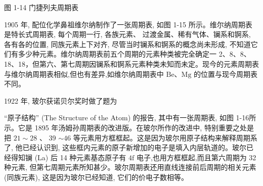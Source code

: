 \documentclass[10pt]{article}
\begin{document}
图 1-14 门捷列夫周期表

1905 年, 配位化学鼻祖维尔纳制作了一张周期表, 如图 1-15 所示。维尔纳周期表是特长式周期表, 每个周期一行, 各族元素、 过渡金属、稀有气体、镧系和锕系, 各有各的位置, 同族元素上下对齐, 尽管当时镧系和锕系的概念尚未形成, 不知道它们有多少种元素。维尔纳周期表前五个周期的元素种类被完全确定一 2、8、8、18、18，但第六、第七周期因镧系和锕系元素种类未知而未定。现今的元素周期表与维尔纳周期表相似,但也有差异,如维尔纳周期表中 \(\mathrm{{Be}}\text{、}\mathrm{{Mg}}\) 的位置与现今周期表不同。

1922 年, 玻尔获诺贝尔奖时做了题为

“原子结构” (The Structure of the Atom) 的报告, 其中有一张周期表, 如图 1-16所示。它是 1895 年汤姆孙周期表的改进版。在玻尔所作的改进中, 特别重要之处是把 \({21} \sim {28}\) 、 39 \(\sim {46}\) 等元素用方框框起。这是因为玻尔用原子结构来解释周期系了, 他已经认识到, 这些框内元素的原子新增加的电子是填入内层轨道的。玻尔已经得知镧 (La) 后 14 种元素基态原子有 \(4\mathrm{f}\) 电子,也用方框框起,而且第六周期为 32 种元素, 但第七周期元素所知甚少。玻尔周期表还用直线连接前后周期的相关元素 (同族元素), 这是因为玻尔已经知道, 它们的价电子数相等。
\end{document}

